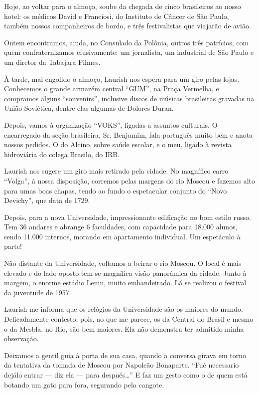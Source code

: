 Hoje, ao voltar para o almoço, soube da chegada de cinco brasileiros ao nosso hotel: os médicos David e Franciosi, do Instituto de Câncer de São Paulo, também nossos companheiros de bordo, e três festivalistas que viajarão de avião.

Ontem encontramos, ainda, no Consulado da Polônia, outros três patrícios, com quem confraternizamos efusivamente: um jornalista, um industrial de São Paulo e um diretor da Tabajara Filmes.

À tarde, mal engolido o almoço, Laurish nos espera para um giro pelas lojas. Conhecemos o grande armazém central ``GUM'', na Praça Vermelha, e compramos alguns ``souvenirs'', inclusive discos de músicas brasileiras gravadas na União Soviética, dentre elas algumas de Dolores Duran.

Depois, vamos à organização ``VOKS'', ligadas a assuntos culturais. O encarregado da seção brasileira, Sr. Benjamim, fala português muito bem e anota nossos pedidos. O do Alcino, sobre saúde escolar, e o meu, ligado à revista hidroviária do colega Brasilo, do IRB.

Laurish nos sugere um giro mais retirado pela cidade. No magnífico carro ``Volga'', à nossa disposição, corremos pelas margens do rio Moscou e fazemos alto para umas boas chapas, tendo ao fundo o espetacular conjunto do ``Novo Devichy'', que data de 1729.

Depois, para a nova Universidade, impressionante edificação no bom estilo russo. Tem 36 andares e abrange 6 faculdades, com capacidade para 18.000 alunos, sendo 11.000 internos, morando em apartamento individual. Um espetáculo à parte!

Não distante da Universidade, voltamos a beirar o rio Moscou. O local é mais elevado e do lado oposto tem-se magnífica visão panorâmica da cidade. Junto à margem, o enorme estádio Lenin, muito embandeirado. Lá se realizou o festival da juventude de 1957.

Laurish me informa que os relógios da Universidade são os maiores do mundo. Delicadamente contesto, pois, ao que me parece, os da Central do Brasil e mesmo o da Mesbla, no Rio, são bem maiores. Ela não demonstra ter admitido minha observação.

Deixamos a gentil guia à porta de sua casa, quando a conversa girava em torno da tentativa da tomada de Moscou por Napoleão Bonaparte. ``Fué necessario dejálo entrar --- diz ela --- para después\ldots'' E faz um gesto como o de quem está botando um gato para fora, segurando pelo cangote.

